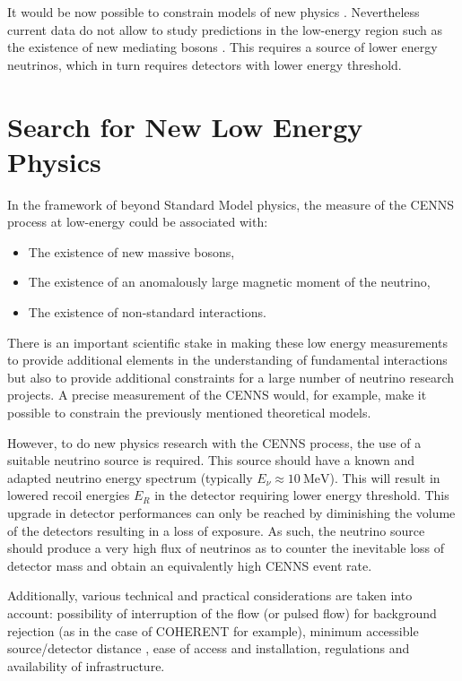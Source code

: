 It would be now possible to constrain models of new physics \cite{Akimov:2017bs}. Nevertheless current data do not allow to study predictions in the low-energy region such as the existence of new mediating bosons \cite{Billard:2018jnl}. This requires a source of lower energy neutrinos, which in turn requires detectors with lower energy threshold.


\section{Search for New Low Energy Physics}

In the framework of beyond Standard Model physics, the measure of the CENNS process at low-energy could be associated with:
\begin{itemize}
	\item The existence of new massive bosons,
	\item The existence of an anomalously large magnetic moment of the neutrino,
	\item The existence of non-standard interactions.
\end{itemize}

There is an important scientific stake in making these low energy measurements to provide additional elements in the understanding of fundamental interactions but also to provide additional constraints for a large number of neutrino research projects. A precise measurement of the CENNS would, for example, make it possible to constrain the previously mentioned theoretical models. 

However, to do new physics research with the CENNS process, the use of a suitable neutrino source is required. This source should have a known and adapted neutrino energy spectrum (typically $E_{\nu} \approx \SI{10}{\mega\eV}$). This will result in lowered recoil energies $E_R$ in the detector requiring lower energy threshold. This upgrade in detector performances can only be reached by diminishing the volume of the detectors resulting in a loss of exposure. As such, the neutrino source should produce a very high flux of neutrinos as to counter the inevitable loss of detector mass and obtain an equivalently high CENNS event rate.

Additionally, various technical and practical considerations are taken into account: possibility of interruption of the flow (or pulsed flow) for background rejection (as in the case of COHERENT for example), minimum accessible source/detector distance
, ease of access and installation, regulations and availability of infrastructure.

